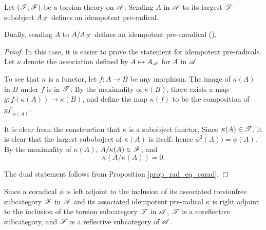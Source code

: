 \begin{prop}\label{prop_tt_to_corad}
Let $(\mathscr{T}, \mathscr{F})$ be a torsion theory on $\mathscr{A}$. 
Sending $A$ in $\mathscr{A}$ to its largest $\mathscr{T}$-subobject 
$A_{\mathscr{T}}$ defines an idempotent pre-radical.

Dually, sending $A$ to $A/A_{\mathscr{T}}$ defines an idempotent 
pre-coradical (\CF \cite[I2.8]{BJV}).
\end{prop}
\begin{proof}
In this case, it is easier to prove the statement for idempotent 
pre-radicals. Let $\kappa$ denote the association defined by $A 
\mapsto A_{\mathscr{A}}$ for $A$ in $\mathscr{A}$.

To see that $\kappa$ is a functor, let $f: A \to B$ be any 
morphism. The image of $\kappa(A)$ in $B$ under $f$ is in 
$\mathscr{T}$. By the maximality of $\kappa(B)$, there exists a map 
$g: f(\kappa(A)) \to \kappa(B)$, and define the map $\kappa(f)$ 
to be the composition of $g f|_{\kappa(A)}$.

It is clear from the construction that $\kappa$ is a subobject 
functor. Since $\kappa(A) \in \mathscr{T}$, it is clear that the 
largest suboboject of $\kappa(A)$ is itself: hence $\phi^2(A)) = 
\phi(A)$. By the maximality of $\kappa(A)$, $A/\kappa(A) \in 
\mathscr{F}$, and 
\[
\kappa(A/\kappa(A)) = 0.
\]

The dual statement follows from Proposition \ref{prop_rad_eq_corad}.
\end{proof}

\begin{rmk}
Since a coradical $\phi$ is left adjoint to the inclusion of its 
associated torsionfree subcategory $\mathscr{F}$ in $\mathscr{A}$ and its 
associated idempotent pre-radical $\kappa$ is right adjoint to the
inclusion of the torsion subcategory $\mathscr{T}$ in $\mathscr{A}$, $\mathscr{T}$
is a coreflective subcategory, and $\mathscr{F}$ is a reflective 
subcategory of $\mathscr{A}$.
\end{rmk}

